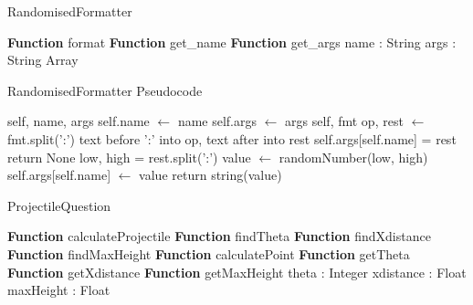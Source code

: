 \begin{algorithm}[H]\label{randomisedFormatter}
	\caption{RandomisedFormatter}
	\begin{algorithmic}[1]
		\public
		\State \textbf{Function} format
		\State \textbf{Function} get\_name
		\State \textbf{Function} get\_args
		\endpublic
		\private
		\State name : String
		\State args : String Array
		\endprivate
		\EndProcedure
	\end{algorithmic}
\end{algorithm}
\begin{algorithm}[H]
	\label{randomformatterps}
	\caption{RandomisedFormatter Pseudocode}
	\begin{algorithmic}[1]
		 {self, name, args}
		\State self.name $\gets$ name
		\State self.args $\gets$ args
		\EndFunction
		 {self, fmt}
		\State op, rest $\gets$ fmt.split(':') \Comment text before ':' into op, text after into  rest
		\State self.args[self.name] = rest
		\State return None
		\EndIf
		\State low, high = rest.split(':')
		\State value $\gets$ randomNumber(low, high)
		\State self.args[self.name] $\gets$ value
		\State return string(value)
		\EndIf
		\EndFunction
		\EndProcedure
	\end{algorithmic}
\end{algorithm}
\begin{algorithm}[H]\label{ProjectileQuestion}
	\caption{ProjectileQuestion}
	\begin{algorithmic}[1]
		\public
		\State \textbf{Function} calculateProjectile
		\State \textbf{Function} findTheta
		\State \textbf{Function} findXdistance
		\State \textbf{Function} findMaxHeight
		\State \textbf{Function} calculatePoint
		\State \textbf{Function} getTheta
		\State \textbf{Function} getXdistance
		\State \textbf{Function} getMaxHeight
		\endpublic
		\private
		\State theta : Integer
		\State xdistance : Float
		\State maxHeight : Float
		\endprivate
		\EndProcedure
	\end{algorithmic}
\end{algorithm}
